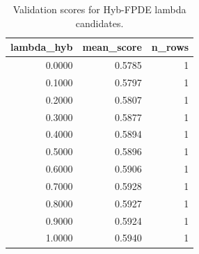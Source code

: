 \begin{table}[t]
\caption{Validation scores for Hyb-FPDE lambda candidates.}
\label{tab:lambda_distribution_computed}
\centering
\begin{tabular}{rrr}
\toprule
lambda\_hyb & mean\_score & n\_rows \\
\midrule
0.0000 & 0.5785 & 1 \\
0.1000 & 0.5797 & 1 \\
0.2000 & 0.5807 & 1 \\
0.3000 & 0.5877 & 1 \\
0.4000 & 0.5894 & 1 \\
0.5000 & 0.5896 & 1 \\
0.6000 & 0.5906 & 1 \\
0.7000 & 0.5928 & 1 \\
0.8000 & 0.5927 & 1 \\
0.9000 & 0.5924 & 1 \\
1.0000 & 0.5940 & 1 \\
\bottomrule
\end{tabular}

\end{table}
